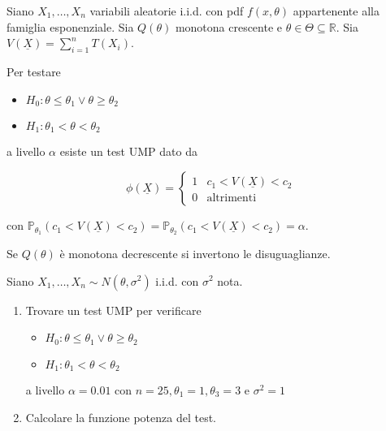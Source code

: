 \documentclass[hidelinks, 10pt]{report}
\begin{document}
\begin{thm}
Siano $ X_{1}, \dotsc, X_{n} $ variabili aleatorie i.i.d. con pdf $ f(x, \theta) $ appartenente alla famiglia esponenziale. Sia $ Q(\theta) $ monotona crescente e $ \theta \in \Theta \subseteq \mathbb{R} $. Sia $ V(\underline{X}) = \sum\limits_{i = 1}^{n} T(X_{i}) $. 

Per testare 
\begin{itemize}
\item $ H_{0}: \theta \le \theta_{1} \lor \theta \ge \theta_{2} $
\item $ H_{1}: \theta_{1} < \theta < \theta_{2} $
\end{itemize}

a livello $ \alpha $ esiste un test UMP dato da

\[ \phi(\underline{X}) = \begin{cases} 1 & c_{1} < V(\underline{X}) < c_{2} \\ 0 & \text{altrimenti} \end{cases} \]

con $ \mathbb{P}_{\theta_{1}} (c_{1} < V(\underline{X}) < c_{2}) = \mathbb{P}_{\theta_{2}} (c_{1} < V(\underline{X}) < c_{2}) = \alpha $.

Se $ Q(\theta) $ \`e monotona decrescente si invertono le disuguaglianze.
\end{thm}

\begin{ex}
Siano $ X_{1}, \dotsc, X_{n} \sim N(\theta, \sigma^{2}) $ i.i.d. con $ \sigma^{2} $ nota.
\begin{enumerate}
\item Trovare un test UMP per verificare
\begin{itemize}
\item $ H_{0}: \theta \le \theta_{1} \lor \theta \ge \theta_{2} $
\item $ H_{1}: \theta_{1} < \theta < \theta_{2} $
\end{itemize}

a livello $ \alpha = 0.01 $ con $ n = 25, \theta_{1} = 1, \theta_{3} = 3 $ e $ \sigma^{2} = 1 $
\item Calcolare la funzione potenza del test.
\end{enumerate}
\end{ex}
\end{document}

